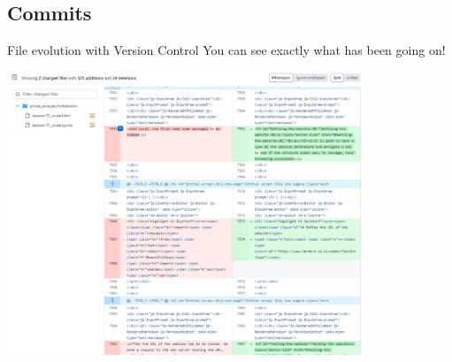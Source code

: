 \documentclass[xcolor=x11names,compress, aspectratio=169]{beamer}
\renewcommand{\(}{\begin{columns}}
\renewcommand{\)}{\end{columns}}
\newcommand{\<}[1]{\begin{column}{#1}}
\renewcommand{\>}{\end{column}}
\begin{document}
\subsection{Commits}

\begin{frame}{File evolution  \textcolor{brique}{with Version Control}  }
You can see exactly what has been going on!
\begin{center}
\begin{itemize}
    {\includegraphics[width = 0.8\textwidth]{GitHubDiff.png} \\ }
\end{itemize}
\end{center}
\end{frame}
\end{document}
